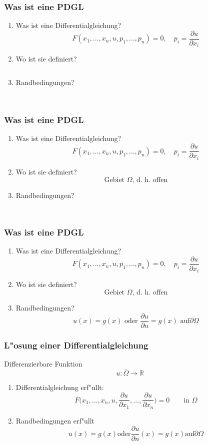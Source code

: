 \documentclass{beamer}
\begin{document}
\begin{frame}
\frametitle{Was ist eine PDGL}
\begin{enumerate}
\item Was ist eine Differentialgleichung?
\[
F( x_1,\dots,x_n,u,p_1, \dots,p_n) =0,\quad p_i=\frac{\partial u}{\partial x_i}
\]
\item Wo ist sie definiert?
\[
\phantom{
\text{Gebiet $\Omega$, d.~h.~offen}
}
\]
\item Randbedingungen?
\[
\phantom{
\text{$u(x)=g(x)$ oder $\frac{\partial u}{\partial n}=g(x)$ auf
$\partial\Omega$}
}
\]
\end{enumerate}
\end{frame}

\begin{frame}
\frametitle{Was ist eine PDGL}
\begin{enumerate}
\item Was ist eine Differentialgleichung?
\[
F( x_1,\dots,x_n,u,p_1, \dots,p_n) =0,\quad p_i=\frac{\partial u}{\partial x_i}
\]
\item Wo ist sie definiert?
\[
\text{Gebiet $\Omega$, d.~h.~offen}
\]
\item Randbedingungen?
\[
\phantom{
\text{$u(x)=g(x)$ oder $\frac{\partial u}{\partial n}=g(x)$ auf
$\partial\Omega$}
}
\]
\end{enumerate}
\end{frame}

\begin{frame}
\frametitle{Was ist eine PDGL}
\begin{enumerate}
\item Was ist eine Differentialgleichung?
\[
F( x_1,\dots,x_n,u,p_1, \dots,p_n) =0,\quad p_i=\frac{\partial u}{\partial x_i}
\]
\item Wo ist sie definiert?
\[
\text{Gebiet $\Omega$, d.~h.~offen}
\]
\item Randbedingungen?
\[
\text{$u(x)=g(x)$ oder $\frac{\partial u}{\partial n}=g(x)$ auf
$\partial\Omega$}
\]
\end{enumerate}
\end{frame}

\begin{frame}
\frametitle{L"osung einer Differentialgleichung}
Differenzierbare Funktion
\[
u\colon \bar\Omega\to\mathbb R
\]
\pause
\begin{enumerate}
\item Differentialgleichung erf"ullt:
\[
F\biggl(x_1,\dots,x_n,u,
\frac{\partial u}{\partial x_1},\dots, \frac{\partial u}{\partial x_n}
\biggr)=0\qquad\text{in $\Omega$}
\]
\pause
\item Randbedingungen erf"ullt
\[
\text{
$u(x)=g(x)$
oder
$\frac{\partial u}{\partial n}(x)=g(x)$
auf
$\partial\Omega$
}
\]
\end{enumerate}
\end{frame}
\end{document}
